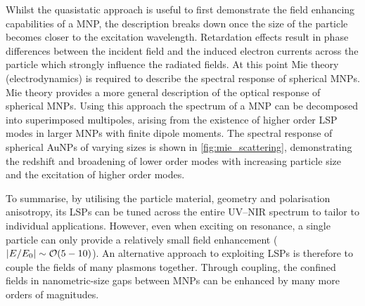 \documentclass{article}
\begin{document}
Whilst the quasistatic approach is useful to first demonstrate the field enhancing capabilities of a MNP, the description breaks down once the size of the particle becomes closer to the excitation wavelength. Retardation effects result in phase differences between the incident field and the induced electron currents across the particle which strongly influence the radiated fields. At this point Mie theory (electrodynamics) \cite{mie1908} is required to describe the spectral response of spherical MNPs. Mie theory provides a more general description of the optical response of spherical MNPs. Using this approach the spectrum of a MNP can be decomposed into superimposed multipoles, arising from the existence of higher order LSP modes in larger MNPs with finite dipole moments. The spectral response of spherical AuNPs of varying sizes is shown in \autoref{fig:mie_scattering}, demonstrating the redshift and broadening of lower order modes with increasing particle size and the excitation of higher order modes.

To summarise, by utilising the particle material, geometry and polarisation anisotropy, its LSPs can be tuned across the entire UV--NIR spectrum to tailor to individual applications. However, even when exciting on resonance, a single particle can only provide a relatively small field enhancement ($\left|E/E_0\right|\sim\mathcal{O}({5-10})$). An alternative approach to exploiting LSPs is therefore to couple the fields of many plasmons together. Through coupling, the confined fields in nanometric-size gaps between MNPs can be enhanced by many more orders of magnitudes.
\end{document}
